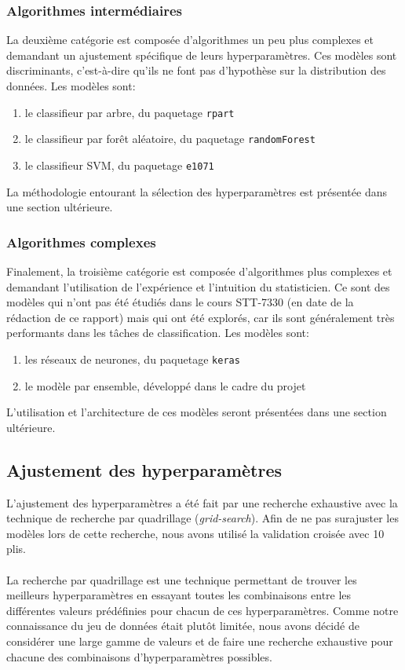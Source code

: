 \subsubsection{Algorithmes intermédiaires}
La deuxième catégorie est composée d'algorithmes un peu plus complexes et demandant un ajustement spécifique de leurs hyperparamètres. Ces modèles sont discriminants, c'est-à-dire qu'ils ne font pas d'hypothèse sur la distribution des données. Les modèles sont:

\begin{enumerate}
  \item le classifieur par arbre, du paquetage \texttt{rpart} \cite{packagerpart}
  \item le classifieur par forêt aléatoire, du paquetage \texttt{randomForest} \cite{packagerandomForest}
  \item le classifieur SVM, du paquetage \texttt{e1071} \cite{packagee1071}
\end{enumerate}

La méthodologie entourant la sélection des hyperparamètres est présentée dans une section ultérieure.

\subsubsection{Algorithmes complexes}
Finalement, la troisième catégorie est composée d'algorithmes plus complexes et demandant l'utilisation de l'expérience et l'intuition du statisticien. Ce sont des modèles qui n'ont pas été étudiés dans le cours STT-7330 (en date de la rédaction de ce rapport) mais qui ont été explorés, car ils sont généralement très performants dans les tâches de classification. Les modèles sont:

\begin{enumerate}
  \item les réseaux de neurones, du paquetage \texttt{keras} \cite{packagekeras}
  \item le modèle par ensemble, développé dans le cadre du projet
\end{enumerate}

L'utilisation et l'architecture de ces modèles seront présentées dans une section ultérieure.

\subsection{Ajustement des hyperparamètres}
L'ajustement des hyperparamètres a été fait par une recherche exhaustive avec la technique de recherche par quadrillage (\textit{grid-search}). Afin de ne pas surajuster les modèles lors de cette recherche, nous avons utilisé la validation croisée avec 10 plis.\\ \\ 
La recherche par quadrillage est une technique permettant de trouver les meilleurs hyperparamètres en essayant toutes les combinaisons entre les différentes valeurs prédéfinies pour chacun de ces hyperparamètres. Comme notre connaissance du jeu de données était plutôt limitée, nous avons décidé de considérer une large gamme de valeurs et de faire une recherche exhaustive pour chacune des combinaisons d'hyperparamètres possibles.

